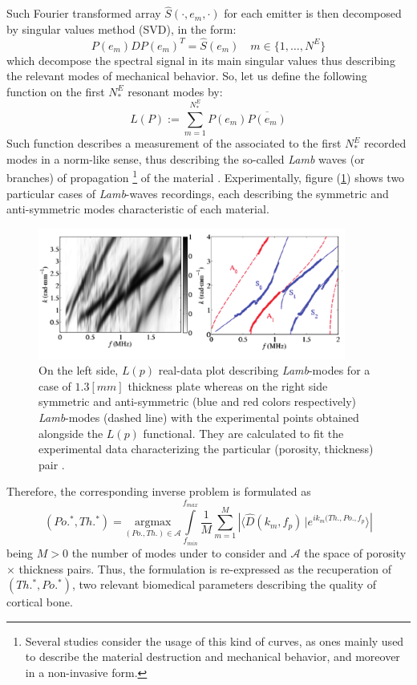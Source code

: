 Such Fourier transformed array $\hat{S}(\cdot, e_m, \cdot)$ for each emitter is then decomposed by singular values method (SVD), in the form:
\begin{equation*}
    P(e_m) \hat{D} P(e_m)^T = \hat{S}(e_m) \quad m \in \{1, \dots, N^E \}
\end{equation*}
which decompose the spectral signal in its main singular values thus describing the relevant modes of mechanical behavior.
So, let us define the following function on the first $N^E_*$ resonant modes by: 
\begin{equation*}
    L(P) := \sum \limits_{m = 1}^{N^E_*} P(e_m) \overline{P(e_m)}
\end{equation*}
Such function describes a measurement of the associated to the first $N^E_*$ recorded modes in a norm-like sense, thus describing the so-called \textit{Lamb} waves (or branches) of propagation \footnote{Several studies consider the usage of this kind of curves, as ones mainly used to describe the material destruction and mechanical behavior, and moreover in a non-invasive form.} of the material \cite{Rhee2007}. Experimentally, figure (\ref{RealLM-Image}) shows two particular cases of \textit{Lamb}-waves recordings, each describing the symmetric and anti-symmetric modes characteristic of each material.

\begin{figure}[!h]
	\centering
	\includegraphics[width=0.9\textwidth]{images/ImgExt/LW-RealCase.png}
	\caption{On the left side, $L(p)$ real-data plot describing \textit{Lamb}-modes for a case of $1.3 [mm]$ thickness plate whereas on the right side symmetric and anti-symmetric (blue and red colors respectively) \textit{Lamb}-modes (dashed line) with the experimental points obtained alongside the $L(p)$ functional. They are calculated to fit the experimental data characterizing the particular (porosity, thickness) pair \cite{Foiret2014}.}
	\label{RealLM-Image}
\end{figure}


Therefore, the corresponding inverse problem is formulated as
\begin{equation*}
    (Po.^*, Th.^*) = \underset{(Po., Th.) \in \mathcal{A}}{\text{argmax}} \int\limits_{f_{min}}^{f_{max}} \frac{1}{M} \sum_{m=1}^M \left \vert \langle \hat{D}(k_m, f_p)\, \vert e^{ik_m(Th., Po., f_p} \rangle \right \vert
\end{equation*}
being $M>0$ the number of modes under to consider and $\mathcal{A}$ the space of porosity $\times$ thickness pairs. Thus, the formulation is re-expressed as the recuperation of $(Th.^*, Po.^*)$, two relevant biomedical parameters describing the quality of cortical bone.

